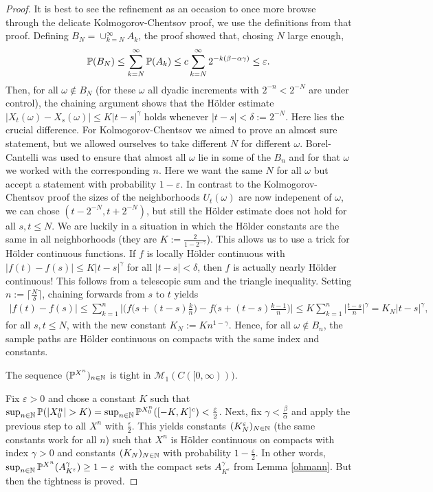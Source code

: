 \begin{proof}[Proof]
	It is best to see the refinement as an occasion to once more browse through the delicate Kolmogorov-Chentsov proof, we use the definitions from that proof. Defining $B_N =\cup_{k=N}^\infty A_k$, the proof showed that, chosing $N$ large enough, 
	\begin{align*}	
		\P(B_N)\leq \sum_{k=N}^\infty \P(A_k)\leq c \sum_{k=N}^\infty 2^{-k(\beta - \alpha  \gamma)} \leq \varepsilon.
	\end{align*}
	Then, for all $\omega\notin B_N$ (for these $\omega$ all dyadic increments with $2^{-n}<2^{-N}$ are under control), the chaining argument shows that the H\"older estimate $|X_t(\omega)-X_s(\omega)|\leq K|t-s|^\gamma$ holds whenever $|t-s|<\delta:=2^{-N}$. Here lies the crucial difference. For Kolmogorov-Chentsov we aimed to prove an almost sure statement, but we allowed ourselves to take different $N$ for different $\omega$. Borel-Cantelli was used to ensure that almost all $\omega$ lie in some of the $B_n$ and for that $\omega$ we worked with the corresponding $n$. Here we want the same $N$ for all $\omega$ but accept a statement with probability $1-\varepsilon$. In contrast to the Kolmogorov-Chentsov proof the sizes of the neighborhoods $U_t(\omega)$ are now indepenent of $\omega$, we can chose $(t-2^{-N},t+2^{-N})$, but still the H\"older estimate does not hold for all $s,t\leq N$. We are luckily in a situation in which the H\"older constants are the same in all neighborhoods (they are $K := \frac{2}{1-2^{-\gamma}}$). This allows us to use a trick for H\"older continuous functions. If $f$ is locally H\"older continuous with $|f(t)-f(s)|\leq K|t-s|^\gamma$ for all $|t-s|<\delta$, then $f$ is actually nearly H\"older continuous! This follows from a telescopic sum and the triangle inequality. Setting $n:=\lceil\frac{N}{\delta}\rceil$, chaining forwards from $s$ to $t$ yields
	\begin{align*}
		|f(t)-f(s)|\leq \sum_{k=1}^n \Big|\Big(f\Big(s+(t-s)\frac{k}{n}\Big)-f\Big(s+(t-s)\frac{k-1}{n}\Big)\Big|\leq K \sum_{k=1}^n \Big|\frac{t-s}{n}\Big|^\gamma=K_N|t-s|^\gamma,
	\end{align*}
	for all $s,t\leq N$, with the new constant $K_N:=K n^{1-\gamma}$. Hence, for all $\omega\notin B_n$, the sample paths are H\"older continuous on compacts with the same index and constants.
	\begin{lstep}
		The sequence $(\P^{X^n})_{n\in\N}$ is tight in $\mathcal M_1(C([0,\infty)))$.
	\end{lstep}
	Fix $\varepsilon>0$ and chose a constant $K$ such that $\sup_{n\in\N}\P(|X^n_0|>K)=\sup_{n\in\N}\P^{X_0^n}([-K,K]^c)<\frac{\varepsilon}{2}$. Next, fix $\gamma<\frac{\beta}{\alpha}$ and apply the previous step to all $X^n$ with $\frac{\varepsilon}{2}$. This yields constants $(K^{\varepsilon}_N)_{N\in\N}$ (the same constants work for all $n$) such that $X^n$ is H\"older continuous on compacts with index $\gamma>0$ and constants $(K_N)_{N\in\N}$ with probability $1-\frac{\varepsilon}{2}$. In other words, $\sup_{n\in\N}\P^{X^n}(A^\gamma_{K^\varepsilon})\geq 1-\varepsilon$ with the compact sets $A^\gamma_{K^\varepsilon}$ from Lemma \ref{ohmann}. But then the tightness is proved.
\end{proof}
